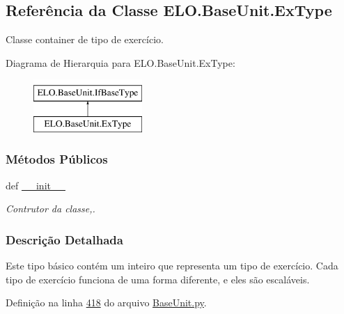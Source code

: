 \hypertarget{classELO_1_1BaseUnit_1_1ExType}{\subsection{Referência da Classe E\-L\-O.\-Base\-Unit.\-Ex\-Type}
\label{classELO_1_1BaseUnit_1_1ExType}
}


Classe container de tipo de exercício.  


Diagrama de Hierarquia para E\-L\-O.\-Base\-Unit.\-Ex\-Type\-:\begin{figure}[H]
\begin{center}
\leavevmode
\includegraphics[height=2.000000cm]{de/d96/classELO_1_1BaseUnit_1_1ExType}
\end{center}
\end{figure}
\subsubsection*{Métodos Públicos}
\begin{DoxyCompactItemize}
\item 
def \hyperlink{classELO_1_1BaseUnit_1_1ExType_aca9932deaf8fe247d16ce17909d3dfbf}{\-\_\-\-\_\-init\-\_\-\-\_\-}
\begin{DoxyCompactList}\small\item\em Contrutor da classe,. \end{DoxyCompactList}\end{DoxyCompactItemize}


\subsubsection{Descrição Detalhada}
Este tipo básico contém um inteiro que representa um tipo de exercício. Cada tipo de exercício funciona de uma forma diferente, e eles são escaláveis. 

Definição na linha \hyperlink{BaseUnit_8py_source_l00418}{418} do arquivo \hyperlink{BaseUnit_8py_source}{Base\-Unit.\-py}.



